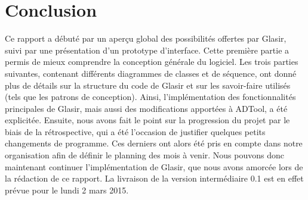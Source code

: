 \section{Conclusion}
    \label{sec:conclusion}

    Ce rapport a débuté par un aperçu global des possibilités offertes par Glasir, suivi par une présentation d'un prototype d'interface. Cette première partie a permis de mieux comprendre la conception générale du logiciel. Les trois parties suivantes, contenant différents diagrammes de classes et de séquence, ont donné plus de détails sur la structure du code de Glasir et sur les savoir-faire utilisés (tels que les patrons de conception). Ainsi, l'implémentation des fonctionnalités principales de Glasir, mais aussi des modifications apportées à ADTool, a été explicitée. Ensuite, nous avons fait le point sur la progression du projet par le biais de la rétrospective, qui a été l'occasion de justifier quelques petits changements de programme. Ces derniers ont alors été pris en compte dans notre organisation afin de définir le planning des mois à venir. Nous pouvons donc maintenant continuer l'implémentation de Glasir, que nous avons amorcée lors de la rédaction de ce rapport. La livraison de la version intermédiaire 0.1 est en effet prévue pour le lundi 2 mars 2015.